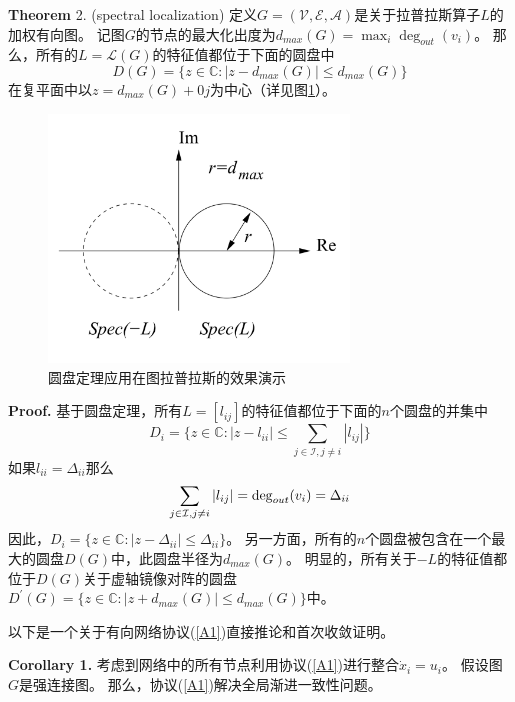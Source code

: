 \documentclass{article}
\begin{document}
\noindent \textbf{Theorem} 2. (spectral localization) 定义$G=(\mathcal{V},\mathcal{E},\mathcal{A})$是关于拉普拉斯算子$L$的加权有向图。
记图$G$的节点的最大化出度为$d_{max}(G) = \max_i \deg_{out}(v_i)$。
那么，所有的$L=\mathcal{L}(G)$的特征值都位于下面的圆盘中
\begin{equation}
    D(G) = \{ z\in \mathbb{C}: |z-d_{max}(G)| \le d_{max}(G) \}
    \label{15}
\end{equation}
在复平面中以$z=d_{max}(G)+0j$为中心（详见图\ref{DiskTheorem}）。
\begin{figure}[htbp]
    \centering
    \includegraphics[width=8cm]{figures/Fig1-DiskTheorem.jpeg}
    \caption{圆盘定理应用在图拉普拉斯的效果演示}
    \label{DiskTheorem}
\end{figure}

\noindent \textbf{Proof.} 基于圆盘定理，所有$L=[l_{ij}]$的特征值都位于下面的$n$个圆盘的并集中
\begin{equation}
    D_i = \{ z\in \mathbb{C}: |z-l_{ii}| \le \sum_{j\in \mathcal{I},j\ne i}|l_{ij}| \}
    \label{16}
\end{equation}
如果$l_{ii} = \Delta_{ii}$那么
\begin{equation}
    \sum_{j\in \mathcal{I},j\ne i}|l_{ij}|=\deg_{out}(v_i) = \Delta_{ii}
    \notag
\end{equation}
因此，$D_i = \{ z\in \mathbb{C}:|z - \Delta_{ii}| \le \Delta_{ii}\}$。
另一方面，所有的$n$个圆盘被包含在一个最大的圆盘$D(G)$中，此圆盘半径为$d_{max}(G)$。
明显的，所有关于$-L$的特征值都位于$D(G)$关于虚轴镜像对阵的圆盘$D^\prime(G)=\{ z\in \mathbb{C}: |z+d_{max}(G)|\le d_{max}(G)\}$中。

以下是一个关于有向网络协议(\ref{A1})直接推论和首次收敛证明。

\noindent \textbf{Corollary 1.} 考虑到网络中的所有节点利用协议(\ref{A1})进行整合$\dot{x}_i = u_i$。
假设图$G$是强连接图。
那么，协议(\ref{A1})解决全局渐进一致性问题。
\end{document}
